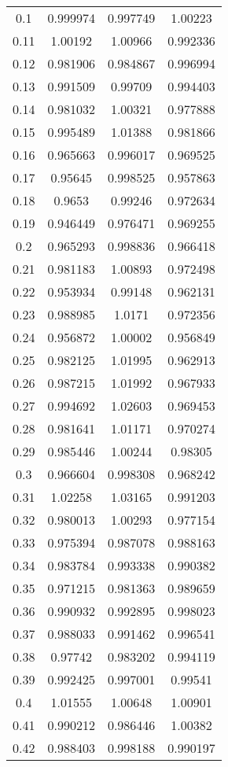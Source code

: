 \begin{table}[h!]
\begin{tabular}{|c|c|c|c|}
0.1 & 0.999974 & 0.997749 & 1.00223 \\
0.11 & 1.00192 & 1.00966 & 0.992336 \\
0.12 & 0.981906 & 0.984867 & 0.996994 \\
0.13 & 0.991509 & 0.99709 & 0.994403 \\
0.14 & 0.981032 & 1.00321 & 0.977888 \\
0.15 & 0.995489 & 1.01388 & 0.981866 \\
0.16 & 0.965663 & 0.996017 & 0.969525 \\
0.17 & 0.95645 & 0.998525 & 0.957863 \\
0.18 & 0.9653 & 0.99246 & 0.972634 \\
0.19 & 0.946449 & 0.976471 & 0.969255 \\
0.2 & 0.965293 & 0.998836 & 0.966418 \\
0.21 & 0.981183 & 1.00893 & 0.972498 \\
0.22 & 0.953934 & 0.99148 & 0.962131 \\
0.23 & 0.988985 & 1.0171 & 0.972356 \\
0.24 & 0.956872 & 1.00002 & 0.956849 \\
0.25 & 0.982125 & 1.01995 & 0.962913 \\
0.26 & 0.987215 & 1.01992 & 0.967933 \\
0.27 & 0.994692 & 1.02603 & 0.969453 \\
0.28 & 0.981641 & 1.01171 & 0.970274 \\
0.29 & 0.985446 & 1.00244 & 0.98305 \\
0.3 & 0.966604 & 0.998308 & 0.968242 \\
0.31 & 1.02258 & 1.03165 & 0.991203 \\
0.32 & 0.980013 & 1.00293 & 0.977154 \\
0.33 & 0.975394 & 0.987078 & 0.988163 \\
0.34 & 0.983784 & 0.993338 & 0.990382 \\
0.35 & 0.971215 & 0.981363 & 0.989659 \\
0.36 & 0.990932 & 0.992895 & 0.998023 \\
0.37 & 0.988033 & 0.991462 & 0.996541 \\
0.38 & 0.97742 & 0.983202 & 0.994119 \\
0.39 & 0.992425 & 0.997001 & 0.99541 \\
0.4 & 1.01555 & 1.00648 & 1.00901 \\
0.41 & 0.990212 & 0.986446 & 1.00382 \\
0.42 & 0.988403 & 0.998188 & 0.990197 \\

\end{tabular}
\end{table}
